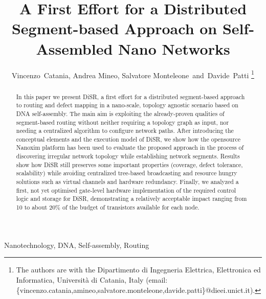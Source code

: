 \documentclass[final,journal,letterpaper]{IEEEtran}
\begin{document}

\title{A First Effort for a Distributed Segment-based Approach on Self-Assembled Nano Networks} 

\author{Vincenzo~Catania, Andrea Mineo, Salvatore Monteleone~and~Davide~Patti%
\thanks{The authors are with the Dipartimento di Ingegneria
Elettrica, Elettronica ed Informatica, Universit\`a di Catania, Italy
(email: \{vincenzo.catania,amineo,salvatore.monteleone,davide.patti\}@dieei.unict.it).}}

\maketitle


\begin{abstract}
In this paper we present DiSR, a first effort for a distributed
segment-based approach to routing and defect mapping in a nano-scale,
topology agnostic scenario based on DNA self-assembly. The main aim is
exploiting the already-proven qualities of segment-based routing
without neither requiring a topology graph as input, nor needing a
centralized algorithm to configure network paths.  After introducing
the conceptual elements and the execution model of DiSR, we show how
the opensource Nanoxim platform has been used to evaluate the proposed
approach in the process of discovering irregular network topology
while establishing network segments.  Results show how DiSR still
preserves some important properties (coverage, defect tolerance,
scalability)  while avoiding centralized tree-based broadcasting and
resource hungry solutions such as virtual channels and hardware
redundancy. Finally, we analyzed a first, not yet optimised gate-level
hardware implementation of the required control logic and storage for
DiSR, demonstrating a relatively acceptable impact ranging from 10 to
about 20\% of the budget of transistors available for each node.
\end{abstract}


\begin{IEEEkeywords}
Nanotechnology, DNA, Self-assembly, Routing
\end{IEEEkeywords}
\end{document}
